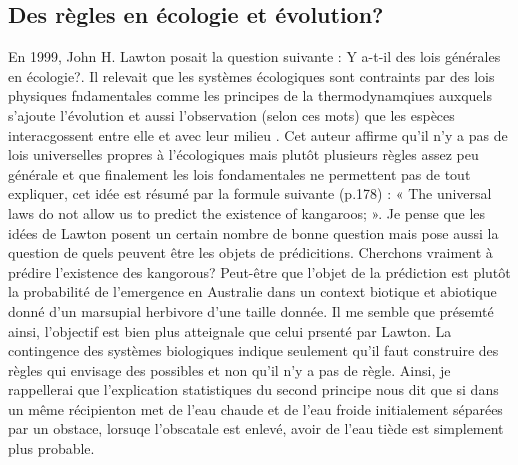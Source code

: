 \subsection*{Des règles en écologie et
évolution?}\label{des-ruxe8gles-en-uxe9cologie-et-uxe9volution}

En 1999, John H. Lawton posait la question suivante : Y a-t-il des lois
générales en écologie?. Il relevait que les systèmes écologiques sont
contraints par des lois physiques fndamentales comme les principes de la
thermodynamqiues auxquels s'ajoute l'évolution et aussi l'observation
(selon ces mots) que les espèces interacgossent entre elle et avec leur
milieu \citep{Lawton1999}. Cet auteur affirme qu'il n'y a pas de lois
universelles propres à l'écologiques mais plutôt plusieurs règles assez
peu générale et que finalement les lois fondamentales ne permettent pas
de tout expliquer, cet idée est résumé par la formule suivante (p.178) :
« The universal laws do not allow us to predict the existence of
kangaroos; ». Je pense que les idées de Lawton posent un certain nombre
de bonne question mais pose aussi la question de quels peuvent être les
objets de prédicitions. Cherchons vraiment à prédire l'existence des
kangorous? Peut-être que l'objet de la prédiction est plutôt la
probabilité de l'emergence en Australie dans un context biotique et
abiotique donné d'un marsupial herbivore d'une taille donnée. Il me
semble que présemté ainsi, l'objectif est bien plus atteignale que celui
prsenté par Lawton. La contingence des systèmes biologiques indique
seulement qu'il faut construire des règles qui envisage des possibles et
non qu'il n'y a pas de règle. Ainsi, je rappellerai que l'explication
statistiques du second principe nous dit que si dans un même récipienton
met de l'eau chaude et de l'eau froide initialement séparées par un
obstace, lorsuqe l'obscatale est enlevé, avoir de l'eau tiède est
simplement plus probable.

